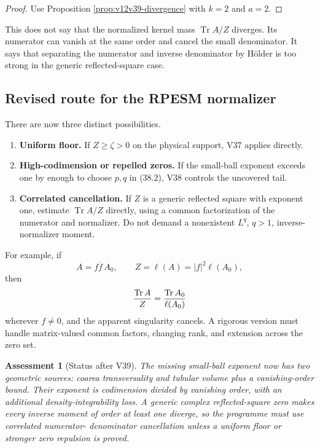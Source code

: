 \documentclass[11pt]{article}
\newtheorem{assessment}[theorem]{Assessment}
\theoremstyle{remark}
\begin{document}
\begin{proof}
Use Proposition \ref{prop:v12v39-divergence} with \(k=2\) and
\(a=2\).
\end{proof}

This does not say that the normalized kernel mass
\(\operatorname{Tr}A/Z\) diverges.  Its numerator can vanish at the
same order and cancel the small denominator.  It says that separating
the numerator and inverse denominator by H\"older is too strong in
the generic reflected-square case.

\subsection{Revised route for the RPESM normalizer}

There are now three distinct possibilities.

\begin{enumerate}
\item \textbf{Uniform floor.}  If \(Z\geq\zeta>0\) on the physical
support, V37 applies directly.
\item \textbf{High-codimension or repelled zeros.}  If the small-ball
exponent exceeds one by enough to choose \(p,q\) in (38.2), V38
controls the uncovered tail.
\item \textbf{Correlated cancellation.}  If \(Z\) is a generic
reflected square with exponent one, estimate
\(\operatorname{Tr}A/Z\) directly, using a common factorization of
the numerator and normalizer.  Do not demand a nonexistent
\(L^q\), \(q>1\), inverse-normalizer moment.
\end{enumerate}

For example, if
\[
 A=f\overline f\,A_0,\qquad
 Z=\ell(A)=|f|^2\ell(A_0),
\]
then
\[
 {\operatorname{Tr}A\over Z}
 =
 {\operatorname{Tr}A_0\over\ell(A_0)}
\]
wherever \(f\ne0\), and the apparent singularity cancels.  A rigorous
version must handle matrix-valued common factors, changing rank, and
extension across the zero set.

\begin{assessment}[Status after V39]
\label{ass:v12v39-status}
The missing small-ball exponent now has two geometric sources:
coarea transversality and tubular volume plus a vanishing-order
bound.  Their exponent is codimension divided by vanishing order,
with an additional density-integrability loss.  A generic complex
reflected-square zero makes every inverse moment of order at least
one diverge, so the programme must use correlated numerator-
denominator cancellation unless a uniform floor or stronger zero
repulsion is proved.
\end{assessment}
\end{document}
